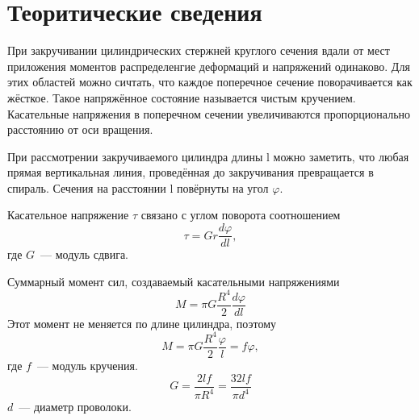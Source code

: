 \section{Теоритические сведения}
При закручивании цилиндрических стержней круглого сечения
вдали от мест приложения моментов распределенгие деформаций
и напряжений одинаково. Для этих областей можно сичтать, что
каждое поперечное сечение поворачивается как жёсткое. Такое
напряжённое состояние называется чистым кручением. Касательные
напряжения в поперечном сечении увеличиваются пропорционально
расстоянию от оси вращения.

При рассмотрении закручиваемого цилиндра длины l можно заметить,
что любая прямая вертикальная линия, проведённая до закручивания
превращается в спираль. Сечения на расстоянии l повёрнуты на угол
$\varphi$.

Касательное напряжение $\tau$ связано с углом поворота соотношением
\[\tau = Gr\frac{d\varphi}{dl},\]
где $G$~--- модуль сдвига.

Суммарный момент сил, создаваемый касательными напряжениями
\[M=\pi G\frac{R^4}{2}\frac{d\varphi}{dl}\]
Этот момент не меняется по длине цилиндра, поэтому 
\[M=\pi G\frac{R^4}{2}\frac{\varphi}{l}=f\varphi,\]
где $f$~--- модуль кручения.
\[G=\frac{2lf}{\pi R^4}=\frac{32lf}{\pi d^4}\]
$d$~--- диаметр проволоки.

